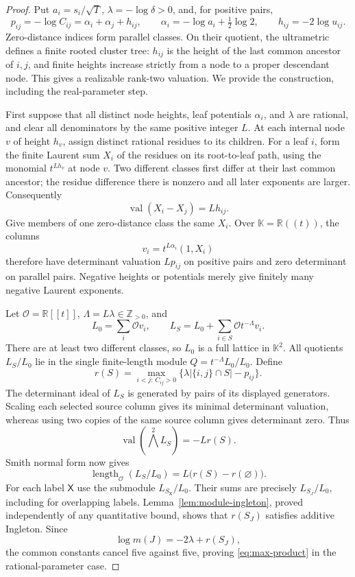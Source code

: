 \documentclass[11pt]{article}
\theoremstyle{remark}
\newcommand{\R}{\mathbb{R}}
\newcommand{\K}{\mathbb{K}}
\newcommand{\OO}{\mathcal{O}}
\newcommand{\length}{\operatorname{length}}
\begin{document}
\begin{proof}
Put $a_i=s_i/\sqrt T$, $\lambda=-\log\delta>0$, and, for positive pairs,
\[
 p_{ij}=-\log C_{ij}=\alpha_i+\alpha_j+h_{ij},\qquad
 \alpha_i=-\log a_i+\tfrac12\log2,\qquad
 h_{ij}=-2\log u_{ij}.
\]
Zero-distance indices form parallel classes.  On their quotient, the
ultrametric defines a finite rooted cluster tree: $h_{ij}$ is the height of
the last common ancestor of $i,j$, and finite heights increase strictly
from a node to a proper descendant node.  This gives a realizable rank-two
valuation.  We provide the construction, including the real-parameter step.

First suppose that all distinct node heights, leaf potentials $\alpha_i$,
and $\lambda$ are rational, and clear all denominators by the same positive
integer $L$.  At each internal node $v$ of height $h_v$, assign distinct
rational residues to its children.  For a leaf $i$, form the finite Laurent
sum $X_i$ of the residues on its root-to-leaf path, using the monomial
$t^{Lh_v}$ at node $v$.  Two different classes first differ at their last
common ancestor; the residue difference there is nonzero and all later
exponents are larger.  Consequently
\[
 \operatorname{val}(X_i-X_j)=Lh_{ij}.
\]
Give members of one zero-distance class the same $X_i$.  Over
$\K=\R((t))$, the columns
\[
 v_i=t^{L\alpha_i}(1,X_i)
\]
therefore have determinant valuation $Lp_{ij}$ on positive pairs and zero
determinant on parallel pairs.  Negative heights or potentials merely give
finitely many negative Laurent exponents.

Let $\OO=\R[[t]]$, $\Lambda=L\lambda\in\mathbb Z_{>0}$, and
\[
 L_0=\sum_i\OO v_i,\qquad
 L_S=L_0+\sum_{i\in S}\OO t^{-\Lambda}v_i.
\]
There are at least two different classes, so $L_0$ is a full lattice in
$\K^2$.  All quotients $L_S/L_0$ lie in the single finite-length module
$Q=t^{-\Lambda}L_0/L_0$.  Define
\[
 r(S)=\max_{i<j:\,C_{ij}>0}
        \{\lambda|\{i,j\}\cap S|-p_{ij}\}.
\]
The determinant ideal of $L_S$ is generated by pairs of its displayed
generators.  Scaling each selected source column gives its minimal
determinant valuation, whereas using two copies of the same source column
gives determinant zero.  Thus
\[
 \operatorname{val}(\bigwedge^2L_S)=-Lr(S).
\]
Smith normal form now gives
\begin{equation}
 \length_\OO(L_S/L_0)=L\bigl(r(S)-r(\varnothing)\bigr).
 \label{eq:explicit-length}
\end{equation}
For each label $\mathsf X$ use the submodule $L_{S_{\mathsf X}}/L_0$.
Their sums are precisely $L_{S_J}/L_0$, including for overlapping labels.
Lemma~\ref{lem:module-ingleton}, proved independently of any
quantitative bound, shows that $r(S_J)$ satisfies additive Ingleton.
Since
\[
 \log m(J)=-2\lambda+r(S_J),
\]
the common constants cancel five against five, proving
\eqref{eq:max-product} in the rational-parameter case.


\end{proof}
\end{document}
